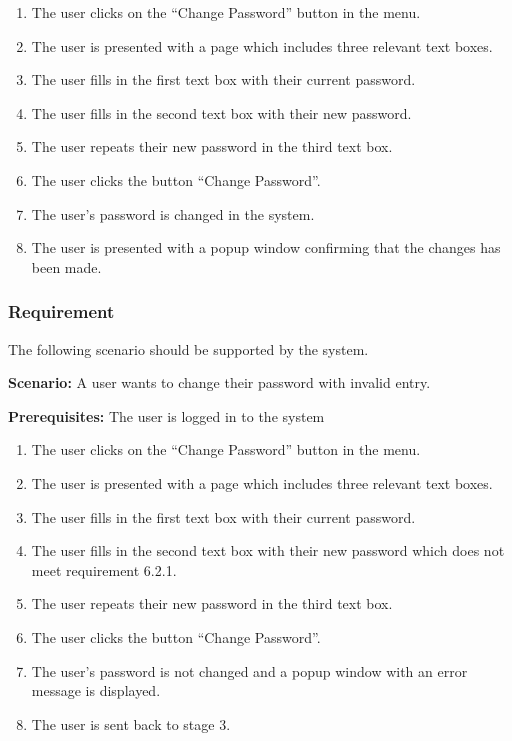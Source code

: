 \documentclass{article}
\begin{document}
\begin{enumerate}
    \item The user clicks on the “Change Password” button in the menu.
    \item The user is presented with a page which includes three relevant text boxes.
    \item The user fills in the first text box with their current password.
    \item The user fills in the second text box with their new password.
    \item The user repeats their new password in the third text box.
    \item The user clicks the button “Change Password”.
    \item The user's password is changed in the system.
    \item The user is presented with a popup window confirming that the changes has been made.
\end{enumerate}



\subsubsection{Requirement}
The following scenario should be supported by the system.

\textbf{Scenario:} A user wants to change their password with invalid entry.

\textbf{Prerequisites:} The user is logged in to the system

\begin{enumerate}
    \item The user clicks on the “Change Password” button in the menu.
    \item The user is presented with a page which includes three relevant text boxes.
    \item The user fills in the first text box with their current password.
    \item The user fills in the second text box with their new password which does not meet requirement 6.2.1.
    \item The user repeats their new password in the third text box.
    \item The user clicks the button “Change Password”.
    \item The user's password is not changed and a popup window with an error message is displayed.
    \item The user is sent back to stage 3.
\end{enumerate}
\end{document}
